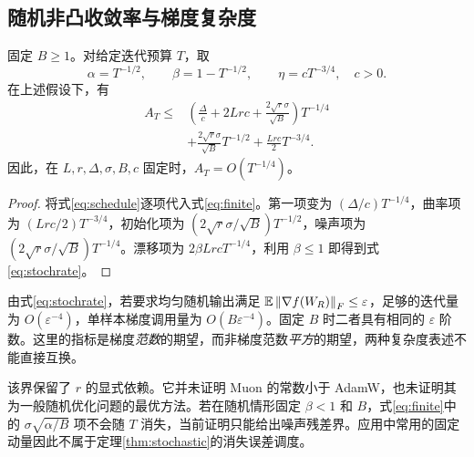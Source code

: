 \subsection{随机非凸收敛率与梯度复杂度}
\begin{theorem}[固定批量的随机收敛率]\label{thm:stochastic}
固定 $B\geq1$。对给定迭代预算 $T$，取
\begin{equation}\label{eq:schedule}
 \alpha=T^{-1/2},\qquad \beta=1-T^{-1/2},\qquad
 \eta=cT^{-3/4},\quad c>0.
\end{equation}
在上述假设下，有
\begin{equation}\label{eq:stochrate}
 \begin{aligned}
 A_T\leq{}&\left(\frac\Delta c+2Lrc+\frac{2\sqrt r\sigma}{\sqrt B}\right)T^{-1/4}\\
 &+\frac{2\sqrt r\sigma}{\sqrt B}T^{-1/2}
 +\frac{Lrc}{2}T^{-3/4}.
 \end{aligned}
\end{equation}
因此，在 $L,r,\Delta,\sigma,B,c$ 固定时，$A_T=O(T^{-1/4})$。
\end{theorem}
\begin{proof}
将式\eqref{eq:schedule}逐项代入式\eqref{eq:finite}。第一项变为 $(\Delta/c)T^{-1/4}$，曲率项为 $(Lrc/2)T^{-3/4}$，初始化项为 $(2\sqrt r\sigma/\sqrt B)T^{-1/2}$，噪声项为 $(2\sqrt r\sigma/\sqrt B)T^{-1/4}$。漂移项为 $2\beta LrcT^{-1/4}$，利用 $\beta\leq1$ 即得到式\eqref{eq:stochrate}。
\end{proof}

由式\eqref{eq:stochrate}，若要求均匀随机输出满足 $\mathbb E\left\lVert\nabla f(W_R)\right\rVert_F\leq\varepsilon$，足够的迭代量为 $O(\varepsilon^{-4})$，单样本梯度调用量为 $O(B\varepsilon^{-4})$。固定 $B$ 时二者具有相同的 $\varepsilon$ 阶数。这里的指标是梯度\emph{范数}的期望，而非梯度范数\emph{平方}的期望，两种复杂度表述不能直接互换。

该界保留了 $r$ 的显式依赖。它并未证明 Muon 的常数小于 AdamW，也未证明其为一般随机优化问题的最优方法。若在随机情形固定 $\beta<1$ 和 $B$，式\eqref{eq:finite}中的 $\sigma\sqrt{\alpha/B}$ 项不会随 $T$ 消失，当前证明只能给出噪声残差界。应用中常用的固定动量因此不属于定理\ref{thm:stochastic}的消失误差调度。


\FloatBarrier
